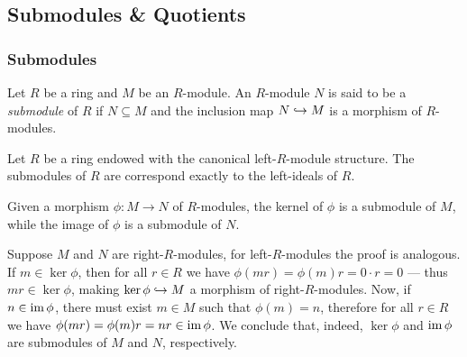 \subsection{Submodules \& Quotients}

\subsubsection{Submodules}

\begin{definition}[Submodule]
    \label{def:submodule}
    Let \(R\) be a ring and \(M\) be an \(R\)-module. An \(R\)-module \(N\) is said
    to be a \emph{submodule} of \(R\) if \(N \subseteq M\) and the inclusion map
    \(N \hookrightarrow M\) is a morphism of \(R\)-modules.
\end{definition}

\begin{example}
    \label{exp:R-submodules-are-ideals}
    Let \(R\) be a ring endowed with the canonical left-\(R\)-module structure. The
    submodules of \(R\) are correspond exactly to the left-ideals of \(R\).
\end{example}

\begin{example}
    \label{exp:ker-im-are-submodules}
    Given a morphism \(\phi: M \to N\) of \(R\)-modules, the kernel of \(\phi\) is a
    submodule of \(M\), while the image of \(\phi\) is a submodule of \(N\).

    Suppose \(M\) and \(N\) are right-\(R\)-modules, for left-\(R\)-modules the
    proof is analogous. If \(m \in \ker \phi\), then for all \(r \in R\) we
    have \(\phi(m r) = \phi(m) r = 0 \cdot r = 0\) --- thus \(m r \in \ker \phi\),
    making \(\ker \phi \hookrightarrow M\) a morphism of right-\(R\)-modules. Now, if \(n \in
    \operatorname{im} \phi\), there must exist \(m \in M\) such that \(\phi(m) = n\), therefore
    for all \(r \in R\) we have \(\phi(m r) = \phi(m) r = n r \in \operatorname{im} \phi\). We
    conclude that, indeed, \(\ker \phi\) and \(\operatorname{im} \phi\) are submodules of \(M\)
    and \(N\), respectively.
\end{example}

